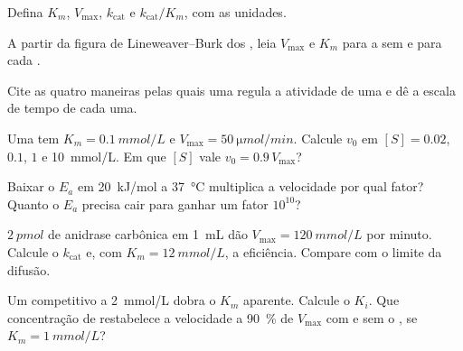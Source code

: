 \begin{exercise}[$\star$]\label{exo:b1:enzymes:2}
Defina $K_m$, $V_{\max}$, $k_{\text{cat}}$ e $k_{\text{cat}}/K_m$, com
as unidades.
\end{exercise}

\begin{exercise}[$\star$]\label{exo:b1:enzymes:3}
A partir da figura de Lineweaver--Burk dos , leia $V_{\max}$ e
$K_m$ para a  sem  e para cada .
\end{exercise}

\begin{exercise}[$\star$]\label{exo:b1:enzymes:4}
Cite as quatro maneiras pelas quais uma  regula a atividade de uma
 e dê a escala de tempo de cada uma.
\end{exercise}

\begin{exercise}[$\star\star$]\label{exo:b1:enzymes:5}
Uma  tem $K_m = \qty{0.1}{mmol/L}$ e $V_{\max} =
\qty{50}{\micro mol/min}$. Calcule $v_0$ em $[S] = 0.02$, $0.1$, $1$ e
\qty{10}{mmol/L}. Em que $[S]$ vale $v_0 = 0.9\,V_{\max}$?
\end{exercise}

\begin{exercise}[$\star\star$]\label{exo:b1:enzymes:6}
Baixar o $E_a$ em \qty{20}{kJ/mol} a \qty{37}{\celsius} multiplica a
velocidade por qual fator? Quanto o $E_a$ precisa cair para ganhar um
fator $10^{10}$?
\end{exercise}

\begin{exercise}[$\star\star$]\label{exo:b1:enzymes:7}
$\qty{2}{pmol}$ de anidrase carbônica em \qty{1}{mL} dão
$V_{\max} = \qty{120}{mmol/L}$ por minuto. Calcule o $k_{\text{cat}}$
e, com $K_m = \qty{12}{mmol/L}$, a eficiência. Compare com o limite da
difusão.
\end{exercise}

\begin{exercise}[$\star\star$]\label{exo:b1:enzymes:8}
Um  competitivo a \qty{2}{mmol/L} dobra o $K_m$ aparente.
Calcule o $K_i$. Que concentração de  restabelece a velocidade
a \qty{90}{\%} de $V_{\max}$ com e sem o , se
$K_m = \qty{1}{mmol/L}$?
\end{exercise}

